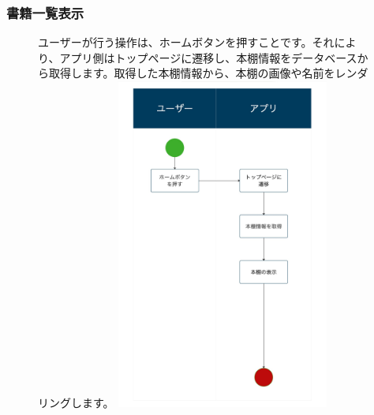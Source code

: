\documentclass[a4paper, 11pt, titlepage]{jsarticle}
\begin{document}
\subsubsection{書籍一覧表示}
\begin{figure}[h]
  ユーザーが行う操作は、ホームボタンを押すことです。それにより、アプリ側はトップページに遷移し、本棚情報をデータベースから取得します。取得した本棚情報から、本棚の画像や名前をレンダリングします。
\includegraphics[width=70mm]{flow-ichiran.jpg}
\label{fig:func}
\end{figure}

\clearpage
\end{document}
